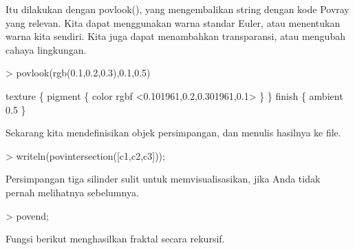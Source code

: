 \documentclass{report}
\begin{document}
\begin{eulernotebook}
\begin{eulercomment}
\begin{eulercomment}
\begin{eulercomment}
Itu dilakukan dengan povlook(), yang mengembalikan string dengan kode
Povray yang relevan. Kita dapat menggunakan warna standar Euler, atau
menentukan warna kita sendiri. Kita juga dapat menambahkan
transparansi, atau mengubah cahaya lingkungan.
\end{eulercomment}
\begin{eulerprompt}
> povlook(rgb(0.1,0.2,0.3),0.1,0.5)
\end{eulerprompt}
\begin{euleroutput}
   texture \{ pigment \{ color rgbf <0.101961,0.2,0.301961,0.1> \}  \} 
   finish \{ ambient 0.5 \} 
  
\end{euleroutput}
\begin{eulercomment}
Sekarang kita mendefinisikan objek persimpangan, dan menulis hasilnya
ke file.
\end{eulercomment}
\begin{eulerprompt}
> writeln(povintersection([c1,c2,c3]));
\end{eulerprompt}
\begin{eulercomment}
Persimpangan tiga silinder sulit untuk memvisualisasikan, jika Anda
tidak pernah melihatnya sebelumnya.
\end{eulercomment}
\begin{eulerprompt}
> povend;
\end{eulerprompt}
\begin{eulercomment}
Fungsi berikut menghasilkan fraktal secara rekursif.


\end{eulercomment}
\end{eulercomment}
\end{eulercomment}
\end{eulernotebook}
\end{document}
